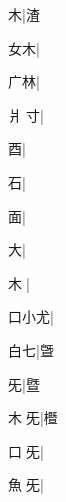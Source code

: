 \begin{multicols}{2}
{{木}|{\cjk{}渣}\par
{\cjk{}{\cnsym{}　}女木}|{}\par
{\cjk{}{\cnsym{}　}广林}|{}\par
{\cjk{}爿{\cnjzr{}}寸}|{}\par
{\cjk{}{\cnsym{}　}{\cnsym{}　}酉}|{}\par
{\cjk{}{\cnsym{}　}{\cnsym{}　}石}|{}\par
{\cjk{}{\cnsym{}　}{\cnsym{}　}面}|{}\par
{大}|{}\par
{木{\cnxb{}𡗜}}|{}\par
{\cjk{}口小尤}|{}\par
{\cjk{}{\cnsym{}　}白七}|{\cjk{}曁}\par
{旡}|{\cjk{}暨}\par
{\cjk{}木{\cnjzr{}}旡}|{\cjk{}櫭}\par
{\cjk{}口{\cnjzr{}}旡}|{}\par
{\cjk{}魚{\cnjzr{}}旡}|{}\par
}
\end{multicols}
